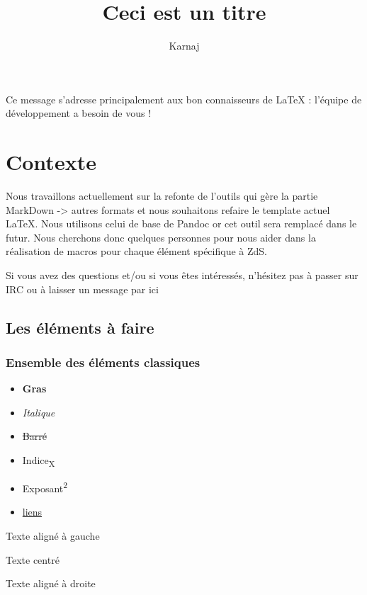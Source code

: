 \documentclass{zmdocument}
\title{Ceci est un titre}
\author{Karnaj}
\begin{document}
\maketitle
\tableofcontents


Ce message s’adresse principalement aux bon connaisseurs de LaTeX : l’équipe de développement a besoin de vous !

\section{Contexte}
Nous travaillons actuellement sur la refonte de l’outils qui gère la partie MarkDown -> autres formats et nous souhaitons refaire le template actuel LaTeX. Nous utilisons celui de base de Pandoc or cet outil sera remplacé dans le futur. Nous cherchons donc quelques personnes pour nous aider dans la réalisation de macros pour chaque élément spécifique à ZdS.

Si vous avez des questions et/ou si vous êtes intéressés, n’hésitez pas à passer sur IRC ou à laisser un message par ici

\subsection{Les éléments à faire}
\subsubsection{Ensemble des éléments classiques}

\begin{itemize}
\item \textbf{Gras}
\item \textit{Italique}
\item \sout{Barré}
\item Indice\textsubscript{X}
\item Exposant\textsuperscript{2}
\item \href{zestedesavoir.com}{liens}
\end{itemize}

\begin{flushleft}
Texte aligné à gauche
\end{flushleft}

\begin{center}
Texte centré
\end{center}

\begin{flushright}
Texte aligné à droite
\end{flushright}
\end{document}
